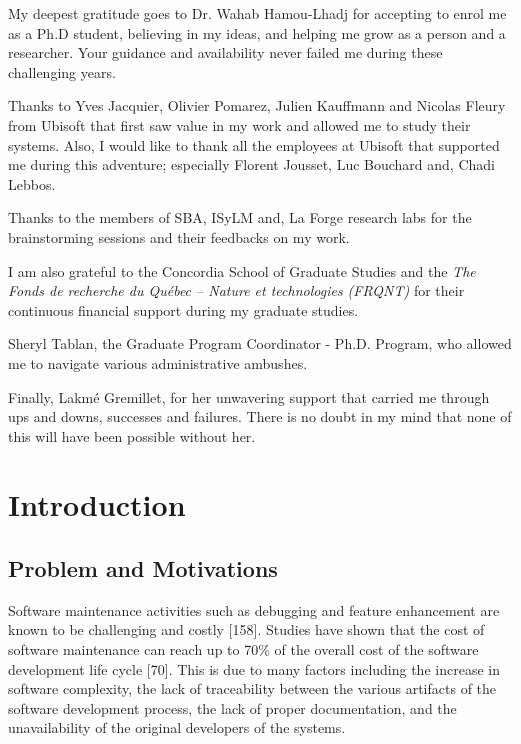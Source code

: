 \documentclass[12pt]{report}
\begin{document}
\begin{acknowledgments}
My deepest gratitude goes to Dr. Wahab Hamou-Lhadj for accepting to enrol me as a Ph.D student, believing in my ideas, and helping me grow as a person and a researcher. Your guidance and availability never failed me during these challenging years. 

Thanks to Yves Jacquier, Olivier Pomarez, Julien Kauffmann and Nicolas Fleury from Ubisoft that first saw value in my work and allowed me to study their systems. Also, I would like to thank all the employees at Ubisoft that supported me during this adventure; especially Florent Jousset, Luc Bouchard and, Chadi Lebbos.

Thanks to the members of SBA, ISyLM and, La Forge research labs for the brainstorming sessions and their feedbacks on my work.

I am also grateful to the Concordia School of Graduate Studies and the \textit{The Fonds de recherche du Qu\'ebec – Nature et technologies (FRQNT)} for their continuous financial support during my graduate studies. 

Sheryl Tablan, the Graduate Program Coordinator - Ph.D. Program, who allowed me to navigate various administrative ambushes. 


Finally, Lakm\'e Gremillet, for her unwavering support that carried me through ups and downs, successes and failures. There is no doubt in my mind that none of this will have been possible without her.
\end{acknowledgments}


\chapter{Introduction}

\section{Problem and Motivations}\label{problem-and-motivations}

Software maintenance activities such as debugging and feature
enhancement are known to be challenging and costly {[}158{]}. Studies
have shown that the cost of software maintenance can reach up to 70\% of
the overall cost of the software development life cycle {[}70{]}. This
is due to many factors including the increase in software complexity,
the lack of traceability between the various artifacts of the software
development process, the lack of proper documentation, and the
unavailability of the original developers of the systems.
\end{document}
